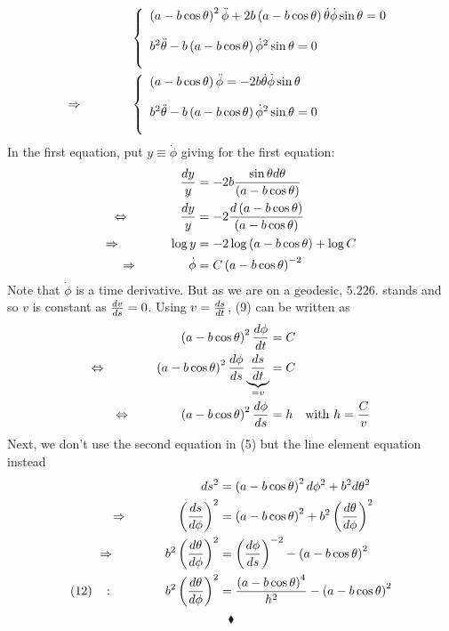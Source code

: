 \begin{align} 
&\left\{\begin{array}{l}
\left(a-b\cos \theta \right)^2   \ddot{\phi}+2b\left(a-b\cos \theta \right)\dot{\theta} \dot{\phi}\sin \theta  =0\\\\
b^2\ddot{\theta}-b\left(a-b\cos \theta \right)\dot{\phi}^2\sin \theta=0\\\\
\end{array}\right.\\
\Rightarrow\quad\quad\quad\quad &\left\{\begin{array}{l}
\left(a-b\cos \theta \right)   \ddot{\phi}=-2b\dot{\theta} \dot{\phi}\sin \theta  \\\\
b^2\ddot{\theta}-b\left(a-b\cos \theta \right)\dot{\phi}^2\sin \theta=0\\\\
\end{array}\right.
\end{align}
In the first equation, put $y \equiv \dot{\phi}$ giving for the first equation:
\begin{align}
\frac{dy}{y}&=-2b \frac{\sin \theta d\theta} {\left(a-b\cos \theta \right)}  \\
\Leftrightarrow\quad\quad\quad\quad\frac{dy}{y}&=-2 \frac{d\left(a-b\cos \theta \right)} {\left(a-b\cos \theta \right)}\\
\Rightarrow \quad\quad\quad\quad \log y&=-2 \log \left(a-b\cos \theta \right)+\log C^{}\\
\Rightarrow \quad\quad\quad\quad \dot{\phi}&= C \left(a-b\cos \theta \right)^{-2}
\end{align}
Note that $\dot{\phi}$ is a time derivative. But as we are on a geodesic, $\mathbf{5.226.}$ stands and so $v$ is constant as $\dv{v}{s} =0$. Using $v = \dv{s}{t}$, (9) can be written as 
\begin{align}
\left(a-b\cos \theta \right)^{2}\dv{\phi}{t}&= C \\
\Leftrightarrow\quad\quad\quad\quad\left(a-b\cos \theta \right)^{2}\dv{\phi}{s}\underbrace{\dv{s}{t}}_{=v}&= C \\
\Leftrightarrow\quad\quad\quad\quad\left(a-b\cos \theta \right)^{2}\dv{\phi}{s}&= h \quad \text{with } h=\frac{C}{v}
\end{align}
Next, we don't use the second equation in (5) but the line element equation instead
\begin{align}
ds^2&=\left(a-b\cos \theta \right)^2 d{\phi}^2+b^2 d\theta^2\\
\Rightarrow\quad\quad\quad\quad \left(\dv{s}{\phi}\right)^2 &= \left(a-b\cos \theta \right)^2 +b^2 \left(\dv{\theta}{\phi}\right)^2\\
\Rightarrow\quad\quad\quad\quad b^2 \left(\dv{\theta}{\phi}\right)^2 &= \left(\dv{\phi}{s}\right)^{-2 }- \left(a-b\cos \theta \right)^2 \\
\left(12\right)\quad \text{: }\quad\quad\quad\quad b^2 \left(\dv{\theta}{\phi}\right)^2 &= \frac{\left(a-b\cos \theta \right)^4}{h^2}- \left(a-b\cos \theta \right)^2
\end{align}
$$\blacklozenge$$
\newpage



